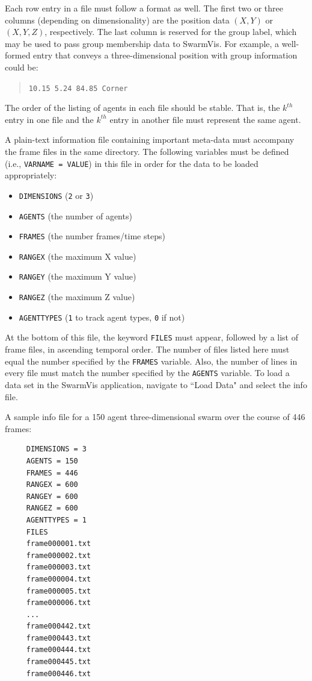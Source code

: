 \documentclass[conference]{IEEEtran}
\begin{document}
Each row entry in a file must follow a format as well. The first two or three  columns (depending on dimensionality) are the
position data $(X, Y)$ or $(X, Y, Z)$, respectively. The last column is reserved for the group label, which may be used to pass
group membership data to SwarmVis.
For example, a well-formed entry that conveys a three-dimensional position with group information could be:
\begin{quote}
\texttt{10.15 5.24 84.85 Corner}
\end{quote}
The order of the listing of agents in each file should be stable.
That is, the $k^{th}$ entry in one file and the $k^{th}$ entry in another file must represent the same agent.

A plain-text information file containing important meta-data must accompany the frame files in the same directory.
The following variables must be defined (i.e., \texttt{VARNAME = VALUE}) in this file in order for the data to be loaded appropriately:
\begin{itemize}
\item \texttt{DIMENSIONS} (\texttt{2} or \texttt{3})
\item \texttt{AGENTS} (the number of agents)
\item \texttt{FRAMES} (the number frames/time steps)
\item \texttt{RANGEX} (the maximum X value)
\item \texttt{RANGEY} (the maximum Y value)
\item \texttt{RANGEZ} (the maximum Z value)
\item \texttt{AGENTTYPES} (\texttt{1} to track agent types, \texttt{0} if not)
\end{itemize}
At the bottom of this file, the keyword \texttt{FILES} must appear, followed by a list of frame files, in ascending
temporal order.
The number of files listed here must equal the number specified by the \texttt{FRAMES} variable.
Also, the number of lines in every file must match the number specified by the \texttt{AGENTS} variable.
To load a data set in the SwarmVis application, navigate to ``Load Data" and select the info file.

A sample info file for a 150 agent three-dimensional swarm over the course of 446 frames:


\begin{verbatim}
     DIMENSIONS = 3
     AGENTS = 150
     FRAMES = 446
     RANGEX = 600
     RANGEY = 600
     RANGEZ = 600
     AGENTTYPES = 1
     FILES
     frame000001.txt
     frame000002.txt
     frame000003.txt
     frame000004.txt
     frame000005.txt
     frame000006.txt
     ...
     frame000442.txt
     frame000443.txt
     frame000444.txt
     frame000445.txt
     frame000446.txt
\end{verbatim}
\end{document}
